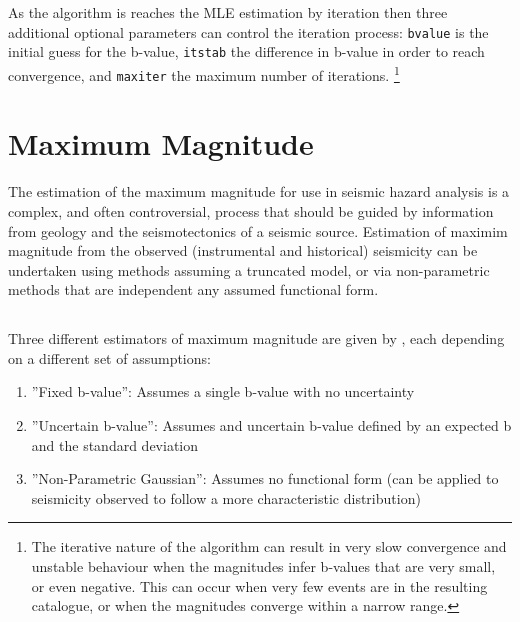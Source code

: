 As the \cite{Weichert1980} algorithm is reaches the MLE estimation by iteration then three additional optional parameters can control the iteration process: \verb=bvalue= is the initial guess for the b-value, \verb=itstab= the difference in b-value in order to reach convergence, and \verb=maxiter= the maximum number of iterations. \footnote{The iterative nature of the \cite{Weichert1980} algorithm can result in very slow convergence and unstable behaviour when the magnitudes infer b-values that are very small, or even negative. This can occur when very few events are in the resulting catalogue, or when the magnitudes converge within a narrow range.}



\section{Maximum Magnitude}

The estimation of the maximum magnitude for use in seismic hazard analysis is a complex, and often controversial, process that should be guided by information from geology and the seismotectonics of a seismic source. Estimation of maximim magnitude from the observed (instrumental and historical) seismicity can be undertaken using methods assuming a truncated \cite{GutenbergRichter1944} model, or via non-parametric methods that are independent any assumed functional form. 

\subsection{\cite{Kijko2004}}

Three different estimators of maximum magnitude are given by \cite{Kijko2004}, each depending on a different set of assumptions:
\begin{enumerate}
\item ''Fixed b-value'': Assumes a single b-value with no uncertainty 
\item ''Uncertain b-value'': Assumes and uncertain b-value defined by an expected b and the standard deviation
\item ''Non-Parametric Gaussian'': Assumes no functional form (can be applied to seismicity observed to follow a more characteristic distribution)
\end{enumerate}

